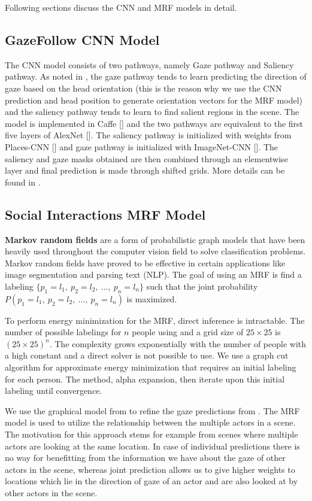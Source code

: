 \documentclass[10pt,twocolumn,letterpaper]{article}
\begin{document}
Following sections discuss the CNN and MRF models in detail.

\subsection{GazeFollow CNN Model}

The CNN model consists of two pathways, namely Gaze pathway and Saliency pathway. As noted in \cite{nips15_recasens}, the gaze pathway tends to learn predicting the direction of gaze based on the head orientation (this is the reason why we use the CNN prediction and head position to generate orientation vectors for the MRF model) and the saliency pathway tends to learn to find salient regions in the scene. The model is implemented in Caffe [] and the two pathways are equivalent to the first five layers of AlexNet []. The saliency pathway is initialized with weights from Places-CNN [] and gaze pathway is initialized with ImageNet-CNN [].
The saliency and gaze masks obtained are then combined through an elementwise layer and final prediction is made through shifted grids. More details can be found in \cite{nips15_recasens}.

\subsection{Social Interactions MRF Model}

\textbf{Markov random fields} are a form of probabilistic graph models that have been heavily used throughout the computer vision field to solve classification problems. Markov random fields have proved to be effective in certain applications like image segmentation and parsing text (NLP). The goal of using an MRF is find a labeling $\{p_1 = l_1,\ p_2 = l_2,\ \dots,\ p_n = l_n\}$ such that the joint probability $P(p_1 = l_1,\ p_2 = l_2,\ \dots,\ p_n = l_n)$ is maximized.

To perform energy minimization for the MRF, direct inference is intractable. The number of possible labelings for $n$ people using and a grid size of $25 \times 25$ is $ (25 \times 25)^n$. The complexity grows exponentially with the number of people with a high constant and a direct solver is not possible to use. We use a graph cut algorithm \cite{boykov2001fast} for approximate energy minimization that requires an initial labeling for each person. The method, alpha expansion, then iterate upon this initial labeling until convergence.

We use the graphical model from \cite{fathi2012social} to refine the gaze predictions from \cite{nips15_recasens}. The MRF model is used to utilize the relationship between the multiple actors in a scene. The motivation for this approach stems for example from scenes where multiple actors are looking at the same location. In case of individual predictions there is no way for benefitting from the information we have about the gaze of other actors in the scene, whereas joint prediction allows us to give higher weights to locations which lie in the direction of gaze of an actor and are also looked at by other actors in the scene.
\end{document}
